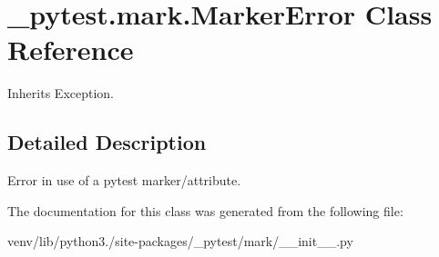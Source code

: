 \hypertarget{class__pytest_1_1mark_1_1_marker_error}{}\section{\+\_\+pytest.\+mark.\+Marker\+Error Class Reference}
\label{class__pytest_1_1mark_1_1_marker_error}


Inherits Exception.



\subsection{Detailed Description}
\begin{DoxyVerb}Error in use of a pytest marker/attribute.\end{DoxyVerb}
 

The documentation for this class was generated from the following file\+:\begin{DoxyCompactItemize}
\item 
venv/lib/python3./site-\/packages/\+\_\+pytest/mark/\+\_\+\+\_\+init\+\_\+\+\_\+.\+py\end{DoxyCompactItemize}
